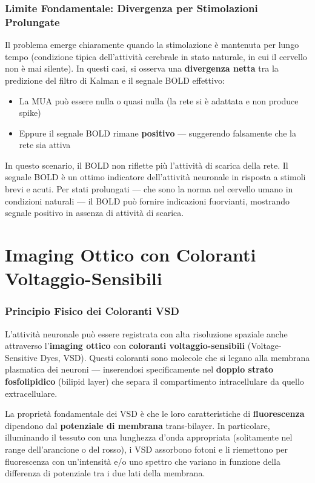 \subsubsection{Limite Fondamentale: Divergenza per Stimolazioni Prolungate}

Il problema emerge chiaramente quando la stimolazione è mantenuta per lungo tempo (condizione tipica dell'attività cerebrale in stato naturale, in cui il cervello non è mai silente). In questi casi, si osserva una \textbf{divergenza netta} tra la predizione del filtro di Kalman e il segnale BOLD effettivo:

\begin{itemize}
    \item La MUA può essere nulla o quasi nulla (la rete si è adattata e non produce spike)
    \item Eppure il segnale BOLD rimane \textbf{positivo} — suggerendo falsamente che la rete sia attiva
\end{itemize}

In questo scenario, il BOLD non riflette più l'attività di scarica della rete. Il segnale BOLD è un ottimo indicatore dell'attività neuronale in risposta a stimoli brevi e acuti. Per stati prolungati — che sono la norma nel cervello umano in condizioni naturali — il BOLD può fornire indicazioni fuorvianti, mostrando segnale positivo in assenza di attività di scarica. 



\section{Imaging Ottico con Coloranti Voltaggio-Sensibili}

\subsubsection{Principio Fisico dei Coloranti VSD}

L'attività neuronale può essere registrata con alta risoluzione spaziale anche attraverso l'\textbf{imaging ottico} con \textbf{coloranti voltaggio-sensibili} (Voltage-Sensitive Dyes, VSD). Questi coloranti sono molecole che si legano alla membrana plasmatica dei neuroni — inserendosi specificamente nel \textbf{doppio strato fosfolipidico} (bilipid layer) che separa il compartimento intracellulare da quello extracellulare.

La proprietà fondamentale dei VSD è che le loro caratteristiche di \textbf{fluorescenza} dipendono dal \textbf{potenziale di membrana} trans-bilayer. In particolare, illuminando il tessuto con una lunghezza d'onda appropriata (solitamente nel range dell'arancione o del rosso), i VSD assorbono fotoni e li riemettono per fluorescenza con un'intensità e/o uno spettro che variano in funzione della differenza di potenziale tra i due lati della membrana.

